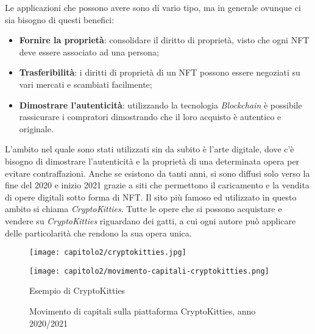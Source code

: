 \noindent Le applicazioni che possono avere sono di vario tipo, ma in generale ovunque ci sia bisogno di questi benefici:
\begin{itemize}
  \item \textbf{Fornire la proprietà}: consolidare il diritto di proprietà, visto che ogni NFT deve essere associato ad una persona;
  \item \textbf{Trasferibilità}: i diritti di proprietà di un NFT possono essere negoziati su vari mercati e scambiati facilmente;
  \item \textbf{Dimostrare l'autenticità}: utilizzando la tecnologia \emph{Blockchain} è possibile rassicurare i compratori dimostrando che il loro acquisto è autentico e originale.
\end{itemize}

L'ambito nel quale sono stati utilizzati sin da subito è l'arte digitale, dove c'è bisogno di dimostrare l'autenticità e la proprietà di una determinata opera per evitare contraffazioni.
Anche se esistono da tanti anni, si sono diffusi solo verso la fine del 2020 e inizio 2021 grazie a siti che permettono il caricamento e la vendita di opere digitali sotto forma di NFT. Il sito più famoso ed utilizzato in questo ambito si chiama \emph{CryptoKitties}. Tutte le opere che si possono acquistare e vendere su \emph{CryptoKitties} riguardano dei gatti, a cui ogni autore può applicare delle particolarità che rendono la sua opera unica.

\begin{figure}[!tbph]
  
  \centering

  \begin{minipage}{0.5\textwidth}
    \texttt{[image: capitolo2/cryptokitties.jpg]}
  \end{minipage}%
  \begin{minipage}{0.5\textwidth}
    \texttt{[image: capitolo2/movimento-capitali-cryptokitties.png]}
  \end{minipage}

  \begin{minipage}[t]{0.5\textwidth}
    \caption{Esempio di CryptoKitties}
  \end{minipage}%
  \begin{minipage}[t]{0.5\textwidth}
    \caption{Movimento di capitali sulla piattaforma CryptoKitties, anno 2020/2021}
  \end{minipage}
\end{figure}

